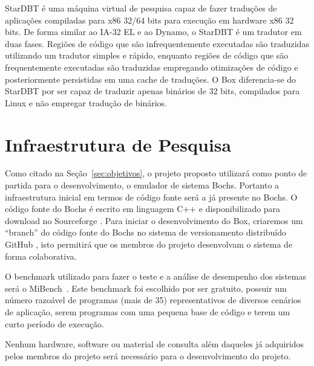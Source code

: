 \documentclass[11pt,twoside]{article}
\begin{document}
StarDBT \cite{Wang2007} é uma máquina virtual de pesquisa capaz de fazer traduções de 
aplicações compiladas para x86 32/64 bits para execução em hardware x86 32 bits. De 
forma similar ao IA-32 EL e ao Dynamo, o StarDBT é um tradutor em duas fases. Regiões 
de código que são infrequentemente executadas são traduzidas utilizando um tradutor 
simples e rápido, enquanto regiões de código que são frequentemente executadas são 
traduzidas empregando otimizações de código e posteriormente persistidas em uma cache 
de traduções. O Box diferencia-se do StarDBT por ser capaz de traduzir apenas binários 
de 32 bits, compilados para Linux e não empregar tradução de binários.





\section{Infraestrutura de Pesquisa} \label{sec:infraestrutura}

Como citado na Seção~\ref{sec:objetivos}, o projeto proposto utilizará como
ponto de partida para o desenvolvimento, o emulador de sistema Bochs. Portanto 
a infraestrutura inicial em termos de código fonte será a já presente no Bochs. 
O código fonte do Bochs é escrito em linguagem C++ e disponibilizado para download
no Sourceforge \cite{bochs_site}. Para iniciar o desenvolvimento do Box, criaremos
um ``branch'' do código fonte do Bochs no sistema de versionamento distribuído
GitHub \cite{github}, isto permitirá que os membros do projeto desenvolvam o sistema
de forma colaborativa.

O benchmark utilizado para fazer o teste e a análise de desempenho dos sistemas será
o MiBench~\cite{Guthaus2001}. Este benchmark foi escolhido por ser gratuito, possuir
um número razoável de programas (mais de 35) representativos de diversos cenários de 
aplicação, serem programas com uma pequena base de código e terem um curto período
de execução.

Nenhum hardware, software ou material de consulta além daqueles já adquiridos 
pelos membros do projeto será necessário para o desenvolvimento do projeto.
\end{document}
